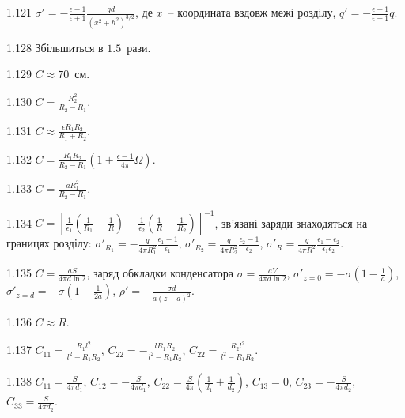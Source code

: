 \begin{Solution}{1.{121}}
	$\sigma' = - \frac{\epsilon - 1}{\epsilon + 1} \frac{qd}{(x^2  +h^2)^{3/2}}$, де $x$~-- координата вздовж межі розділу, $q' = - \frac{\epsilon - 1}{\epsilon + 1}q$.
\end{Solution}
\begin{Solution}{1.{128}}
	Збільшиться в $1.5$~рази.
\end{Solution}
\begin{Solution}{1.{129}}
	$C \approx 70$~см.
\end{Solution}
\begin{Solution}{1.{130}}
	$C = \frac{R_2^2}{R_2 - R_1}$.
\end{Solution}
\begin{Solution}{1.{131}}
	$C \approx \frac{\epsilon R_1R_2}{R_1 + R_2}$.
\end{Solution}
\begin{Solution}{1.{132}}
	$C =\frac{R_1R_2}{R_2 - R_1} \left( 1 + \frac{\epsilon - 1}{4\pi}\Omega\right) $.
\end{Solution}
\begin{Solution}{1.{133}}
	$C = \frac{aR_1^2}{R_2 - R_1}$.
\end{Solution}
\begin{Solution}{1.{134}}
	$C = \left[ \frac{1}{\epsilon_1}\left( \frac{1}{R_1} - \frac{1}{R}\right) + \frac{1}{\epsilon_2}\left( \frac{1}{R} - \frac{1}{R_2}\right) \right]^{-1} $, зв'язані заряди знаходяться на границях розділу: $\sigma'_{R_1} = - \frac{q}{4\pi R_1^2}\frac{\epsilon_1 - 1}{\epsilon_1}$, $\sigma'_{R_2} =  \frac{q}{4\pi R_2^2}\frac{\epsilon_2 - 1}{\epsilon_2}$, $\sigma'_{R} = \frac{q}{4\pi R^2}\frac{\epsilon_1 - \epsilon_2}{\epsilon_1\epsilon_2}$.
\end{Solution}
\begin{Solution}{1.{135}}
	$C = \frac{aS}{4\pi d\ln2}$, заряд обкладки конденсатора $\sigma = \frac{aV}{4\pi d\ln2}$, $\sigma'_{z=0} = -\sigma \left( 1 - \frac{1}{a} \right) $, $\sigma'_{z=d} = -\sigma \left( 1 - \frac{1}{2a} \right) $, $\rho' = -\frac{\sigma d}{a(z + d)^2}$.
\end{Solution}
\begin{Solution}{1.{136}}
	$C \approx R$.
\end{Solution}
\begin{Solution}{1.{137}}
	$C_{11} = \frac{R_1 l^2}{l^2 - R_1R_2}$, $C_{22}  = -\frac{lR_1R_2}{l^2 - R_1R_2}$, $C_{22} = \frac{R_2 l^2}{l^2 - R_1R_2}$.
\end{Solution}
\begin{Solution}{1.{138}}
	$C_{11} = \frac{S}{4\pi d_1}$, $C_{12} = -\frac{S}{4\pi d_1}$, $C_{22} = \frac{S}{4\pi}\left( \frac{1}{d_1} + \frac{1}{d_2} \right) $, $C_{13} = 0$, $C_{23} = -\frac{S}{4\pi d_2}$, $C_{33} = \frac{S}{4\pi d_2}$.
\end{Solution}
